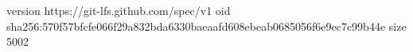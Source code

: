 version https://git-lfs.github.com/spec/v1
oid sha256:570f57bfcfe066f29a832bda6330baeaafd608ebeab0685056f6e9ec7c99b44e
size 5002
